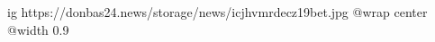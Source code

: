  
 
 
 
 

\ifcmt
  ig https://donbas24.news/storage/news/icjhvmrdecz19bet.jpg
  @wrap center
  @width 0.9
\fi
